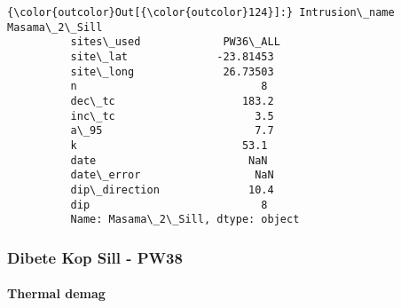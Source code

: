 \documentclass{article}
\begin{document}
            \begin{Verbatim}[commandchars=\\\{\}]
{\color{outcolor}Out[{\color{outcolor}124}]:} Intrusion\_name    Masama\_2\_Sill
          sites\_used             PW36\_ALL
          site\_lat              -23.81453
          site\_long              26.73503
          n                             8
          dec\_tc                    183.2
          inc\_tc                      3.5
          a\_95                        7.7
          k                          53.1
          date                        NaN
          date\_error                  NaN
          dip\_direction              10.4
          dip                           8
          Name: Masama\_2\_Sill, dtype: object
\end{Verbatim}
        
    \subsubsection{Dibete Kop Sill - PW38}\label{dibete-kop-sill---pw38}

    \paragraph{Thermal demag}\label{thermal-demag}
\end{document}
